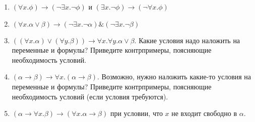 \begin{enumerate}
\item $(\forall x.\phi) \rightarrow (\neg \exists x.\neg \phi)$ и $(\exists x.\neg\phi) \rightarrow (\neg \forall x.\phi)$
\item $(\forall x.\alpha\vee\beta) \rightarrow (\neg \exists x.\neg \alpha) \& (\neg \exists x.\neg\beta)$
\item $((\forall x.\alpha) \vee (\forall y.\beta)) \rightarrow \forall x.\forall y.\alpha\vee\beta$. Какие условия
надо наложить на переменные и формулы? Приведите контрпримеры, поясняющие необходимость условий.
\item $(\alpha\rightarrow\beta) \rightarrow \forall x.(\alpha\rightarrow\beta)$. Возможно, нужно наложить
какие-то условия на переменные и формулы? Приведите контрпримеры, поясняющие необходимость условий (если 
условия требуются).
\item $(\alpha \rightarrow \forall x.\beta) \rightarrow (\forall x.\alpha\rightarrow\beta)$ при условии, что $x$ не входит свободно в $\alpha$.
\end{enumerate}
